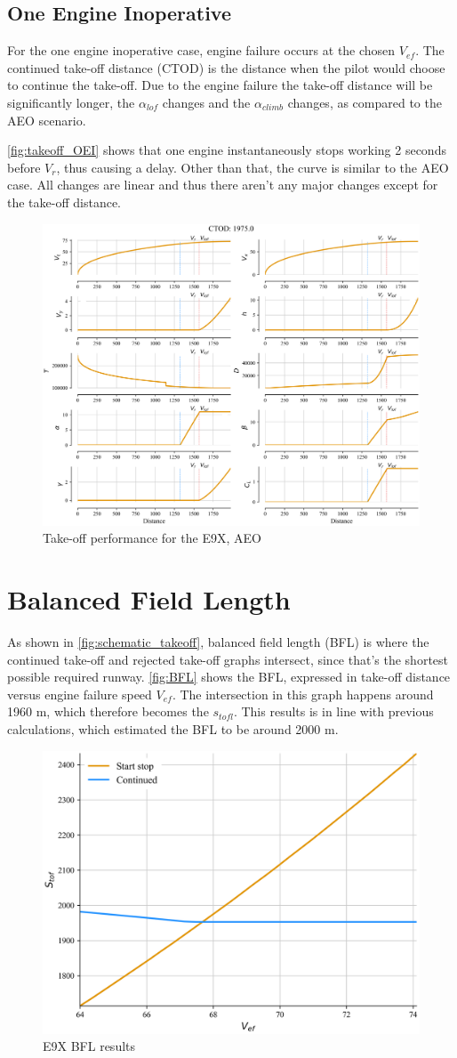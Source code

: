 \subsection{One Engine Inoperative}\label{sec:AEO}
For the one engine inoperative case, engine failure occurs at the chosen $V_{ef}$. The continued take-off distance (CTOD) is the distance when the pilot would choose to continue the take-off. Due to the engine failure the take-off distance will be significantly longer, the $\alpha_{lof}$ changes and the $\alpha_{climb}$ changes, as compared to the AEO scenario.

\autoref{fig:takeoff_OEI} shows that one engine instantaneously stops working 2 seconds before $V_r$, thus causing a delay. Other than that, the curve is similar to the AEO case. All changes are linear and thus there aren't any major changes except for the take-off distance.

\begin{figure}[!ht]
    \centering
    \includegraphics[width=0.8\linewidth]{figures/E9X_takeoff_level2b_ctod_OEI.png}
    \caption{Take-off performance for the E9X, AEO}
    \label{fig:takeoff_OEI}
\end{figure}

\section{Balanced Field Length}\label{sec:BFL}
As shown in \autoref{fig:schematic_takeoff}, balanced field length (BFL) is where the continued take-off and rejected take-off graphs intersect, since that's the shortest possible required runway. \autoref{fig:BFL} shows the BFL, expressed in take-off distance versus engine failure speed $V_{ef}$. The intersection in this graph happens around 1960 m, which therefore becomes the $s_{tofl}$. This results is in line with previous calculations, which estimated the BFL to be around 2000 m.

\begin{figure}[!ht]
    \centering
    \includegraphics[width=0.5\linewidth]{figures/E9X_BFL.png}
    \caption{E9X BFL results}
    \label{fig:BFL}
\end{figure}
